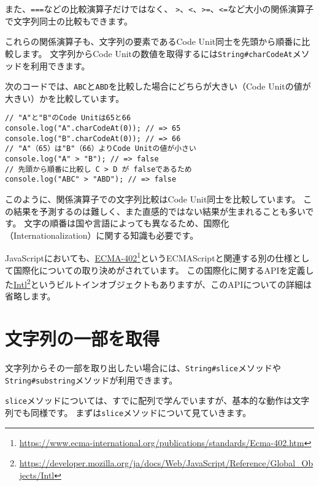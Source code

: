 また、\texttt{===}などの比較演算子だけではなく、
\texttt{>}、\texttt{<}、\texttt{>=}、\texttt{<=}など大小の関係演算子で文字列同士の比較もできます。

これらの関係演算子も、文字列の要素であるCode
Unit同士を先頭から順番に比較します。 文字列からCode
Unitの数値を取得するには\texttt{String\#charCodeAt}メソッドを利用できます。

次のコードでは、\texttt{ABC}と\texttt{ABD}を比較した場合にどちらが大きい（Code
Unitの値が大きい）かを比較しています。

\begin{lstlisting}
// "A"と"B"のCode Unitは65と66
console.log("A".charCodeAt(0)); // => 65
console.log("B".charCodeAt(0)); // => 66
// "A"（65）は"B"（66）よりCode Unitの値が小さい
console.log("A" > "B"); // => false
// 先頭から順番に比較し C > D が falseであるため
console.log("ABC" > "ABD"); // => false
\end{lstlisting}

このように、関係演算子での文字列比較はCode Unit同士を比較しています。
この結果を予測するのは難しく、また直感的ではない結果が生まれることも多いです。
文字の順番は国や言語によっても異なるため、国際化（Internationalization）に関する知識も必要です。

JavaScriptにおいても、\href{https://www.ecma-international.org/publications/standards/Ecma-402.htm}{ECMA-402}\footnote{\url{https://www.ecma-international.org/publications/standards/Ecma-402.htm}}というECMAScriptと関連する別の仕様として国際化についての取り決めがされています。
この国際化に関するAPIを定義した\href{https://developer.mozilla.org/ja/docs/Web/JavaScript/Reference/Global_Objects/Intl}{Intl}\footnote{\url{https://developer.mozilla.org/ja/docs/Web/JavaScript/Reference/Global_Objects/Intl}}というビルトインオブジェクトもありますが、このAPIについての詳細は省略します。

\hypertarget{slice}{%
\section{文字列の一部を取得}\label{slice}}

文字列からその一部を取り出したい場合には、\texttt{String\#slice}メソッドや\texttt{String\#substring}メソッドが利用できます。

\texttt{slice}メソッドについては、すでに配列で学んでいますが、基本的な動作は文字列でも同様です。
まずは\texttt{slice}メソッドについて見ていきます。

